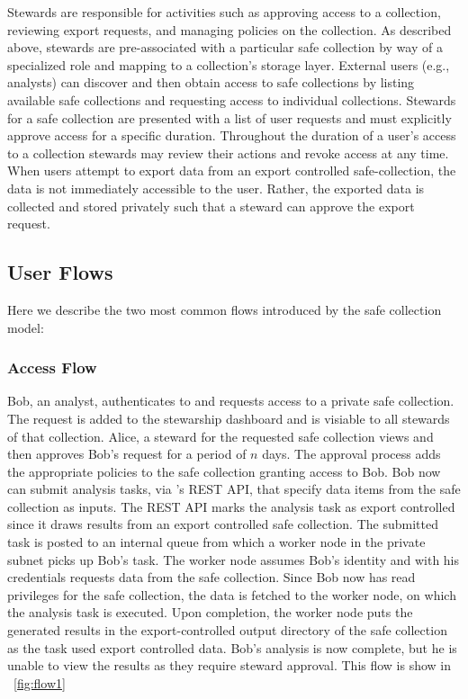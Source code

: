 Stewards are responsible for activities such as approving access to a collection, reviewing
export requests, and managing policies on the collection.
As described above, stewards are pre-associated with a particular safe collection by
way of a specialized role and mapping to a collection's storage layer.
External users (e.g., analysts) can discover
and then obtain access to safe collections by listing available safe collections and requesting
access to individual collections.
Stewards for a safe collection are presented with a list of user requests and must explicitly approve access
for a specific duration. Throughout the duration of a user's access to a collection
stewards may review their actions and revoke access at any time. When users attempt
to export data from an export controlled safe-collection, the data is not immediately
accessible to the user. Rather, the exported data is collected and stored privately
such that a steward can approve the export request.


\subsection{User Flows}

Here we describe the two most common flows introduced by the safe collection model:

\subsubsection{Access Flow}

Bob, an analyst, authenticates to \NAME and requests access to a private safe collection.
The request is added to the stewarship dashboard and is visiable to all stewards
of that collection. Alice, a steward for the requested
safe collection views and then approves Bob's request for a period of $n$ days.
The approval process adds the appropriate policies to the
safe collection granting access to Bob. Bob now can submit analysis tasks, via
\NAMENS's REST API, that specify data items from the safe collection as inputs.
The REST API marks the analysis task as export controlled since it draws results
from an export controlled safe collection.
The submitted task is posted to an internal queue from which a
worker node in the \NAME private subnet picks up Bob's task. The worker node assumes Bob's identity and with
his credentials requests data from the safe collection. Since Bob now has read privileges for the
safe collection, the data is fetched to the worker node, on which the analysis task is executed.
Upon completion, the worker node puts the generated results in the export-controlled
output directory of the safe collection as the task used export controlled data.
Bob's analysis is now complete, but he is unable to view the
results as they require steward approval. This flow is show in \figurename~\ref{fig:flow1}

